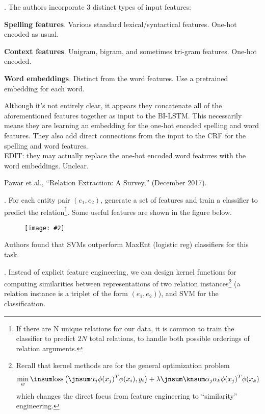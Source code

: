 \documentclass[11pt]{article}
\newcommand\myfig[2][0.3\textwidth]{\begin{figure}[h!]\centering\texttt{[image: \#2]}\end{figure}}
\newcommand\myspace[1][]{\vspace{#1\bigskipamount}}
\newcommand\p{\Needspace{10\baselineskip} \noindent}
\begin{document}
\myspace
\p {}. The authors incorporate 3 distinct types of input features:
\begin{compactitem}
	\item \textbf{Spelling features}. Various standard lexical/syntactical features. One-hot encoded as usual.
	\item \textbf{Context features}. Unigram, bigram, and sometimes tri-gram features. One-hot encoded.
	\item \textbf{Word embeddings}. Distinct from the word features. Use a pretrained embedding for each word. 
\end{compactitem}
Although it's not entirely clear, it appears they concatenate all of the aforementioned features together as input to the BI-LSTM. This necessarily means they are learning an embedding for the one-hot encoded spelling and word features. They also add direct connections from the input to the CRF for the spelling and word features. \\

EDIT: they may actually replace the one-hot encoded word features with the word embeddings. Unclear.












\vspace{-1em}
{\footnotesize Pawar et al., ``Relation Extraction: A Survey,'' (December 2017).}



\p {}. For each entity pair $(e_1, e_2)$, generate a set of features and train a classifier to predict the relation\footnote{If there are N unique relations for our data, it is common to train the classifier to predict $2N$ total relations, to handle both possible orderings of relation arguments.}. Some useful features are shown in the figure below.
	\myfig[0.6\textwidth]{figs/re_feature_types.png}
	
	Authors found that SVMs outperform MaxEnt (logistic reg) classifiers for this task.
	

\myspace
\p {}. Instead of explicit feature engineering, we can design kernel functions for computing similarities between representations of two relation instances\footnote{Recall that kernel methods are for the general optimization problem 
	\begin{align}
		\min_w \insum \text{loss}\left( \jnsum \alpha_j \phi(x_j)^T \phi(x_i), y_i  \right) + \lambda \jnsum \knsum \alpha_j \alpha_k \phi(x_j)^T\phi(x_k)
	\end{align}
which changes the direct focus from feature engineering to ``similarity'' engineering.
} (a relation instance is a triplet of the form $(e_1, e_2)$), and SVM for the classification. \\
\end{document}
